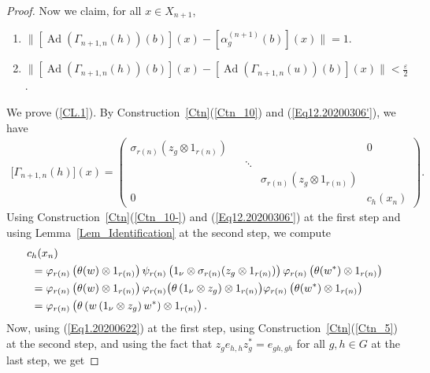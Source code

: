 \documentclass[10pt]{amsart}
\newcounter{TmpEnumi}
\numberwithin{equation}{section}
\theoremstyle{definition}
\newcommand{\ep}{\varepsilon}
\newcommand{\Ad}{{\operatorname{Ad}}}
\begin{document}
\begin{proof}
Now we claim, for all $x \in X_{n+1}$,
\begin{enumerate}
\setcounter{enumi}{\value{TmpEnumi}}
%
\item\label{CL.1}
$\Big\|
\left[\Ad \left(\Gamma_{n+1, n}(h)\right)(b)\right](x)
- 
\left[\alpha^{(n+1)}_{g} (b)\right](x) 
\Big\| =1.
$
\item\label{CL.2}
$\Big\| 
\left[\Ad \left(\Gamma_{n+1, n} (h)\right) (b)\right](x)
 - 
 \left[\Ad \left(\Gamma_{n+1, n}(u)\right) (b)\right] (x)
  \Big\| < \frac{\ep}{2}$.
\end{enumerate} 
We prove (\ref{CL.1}). 
By Construction~\ref{Ctn}(\ref{Ctn_10}) and (\ref{Eq12.20200306'}), we have
\begin{align}\label{EQ11.20200306}
\big[\Gamma_{n+1, n} (h) \big] (x)
  =
 \left( \begin{matrix}
    \sigma_{r(n)} \left(z_g \otimes 1_{r(n)}\right) & & & &0 \\
    & &  \ddots      &      \\
    & & & \sigma_{r(n)} \left(z_g \otimes 1_{r(n)}\right) \\
 0  & & & &   
c_{h} (x_n)
 \end{matrix} \right).
\end{align}
Using Construction~\ref{Ctn}(\ref{Ctn_10-}) and  (\ref{Eq12.20200306'}) at the first step
and using Lemma~\ref{Lem_Identification} at the second step,  we compute
\begin{align}
\label{Eq3.20200622}
&c_{h} (x_n)
\\\notag
&\hspace*{.4em} {\mbox{}}=
\varphi_{r(n)} \left(\theta(w) \otimes 1_{r(n)} \right)
\psi_{r(n)} \left(1_{\nu} \otimes \sigma_{r(n)}(z_g \otimes 1_{r(n)})\right)
\varphi_{r(n)} \left(\theta(w^*) \otimes 1_{r(n)} \right)
\\\notag
&\hspace*{.4em} {\mbox{}}=
\varphi_{r(n)} \left(\theta(w) \otimes 1_{r(n)} \right)
\varphi_{r(n)} \big(\theta \left(1_\nu \otimes z_g\right) \otimes 1_{r(n)}\big)
\varphi_{r(n)} \left(\theta(w^*) \otimes 1_{r(n)} \right)
\\\notag
&\hspace*{.4em} {\mbox{}}=
\varphi_{r(n)} \left(\theta \left(w \left(1_\nu \otimes z_g\right)w^*\right) \otimes 1_{r(n)} \right). 
\end{align}
Now, using (\ref{Eq1.20200622}) at the first step, using Construction~\ref{Ctn}(\ref{Ctn_5}) at the second step,
and
using the fact that  $z_g e_{h, h} z^*_g=e_{gh, gh}$ for all $g, h\in G$ at the last step, we get

\end{proof}
\end{document}
